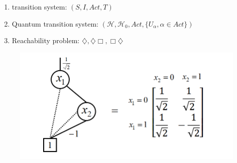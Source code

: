 \documentclass[aspectratio=1610,18pt]{ctexbeamer}
\begin{document}
\begin{frame}
  \begin{enumerate}
    \Large
    \item  transition system: $(S, I, Act, T)$
    \item Quantum transition system: $(\mathcal{H}, \mathcal{H}_0, Act, \{U_\alpha,\alpha\in Act\})$
    \item Reachability problem: $\diamondsuit,\diamondsuit\Box,\Box\diamondsuit $
  \end{enumerate}
\end{frame}

\begin{frame}
  \begin{figure}
    \includegraphics[width = .8\textwidth]{TDD_H_gate2.png}
  \end{figure}
\end{frame}
\end{document}
